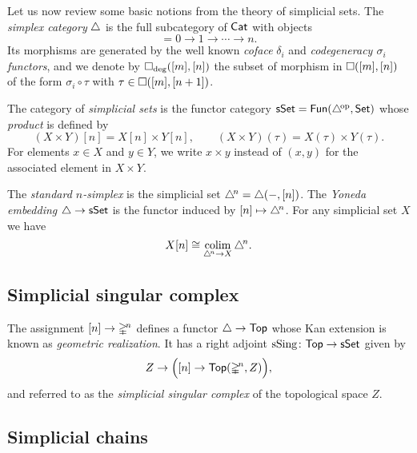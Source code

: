 Let us now review some basic notions from the theory of simplicial sets.
The \textit{simplex category} $\triangle$ is the full subcategory of $\mathsf{Cat}$ with objects
\begin{equation*}
[n] = 0 \to 1 \to \cdots \to n.
\end{equation*}
Its morphisms are generated by the well known \textit{coface} $\delta_i$ and \textit{codegeneracy $\sigma_i$ functors}, and we denote by $\square_{\deg}([m], [n])$ the subset of morphism in $\square([m], [n])$ of the form $\sigma_i \circ \tau$ with $\tau \in \square([m], [n+1])$.


The category of \textit{simplicial sets} is the functor category $\mathsf{sSet} = \mathsf{Fun}(\triangle^{\!\mathrm{op}}, \mathsf{Set})$ whose \textit{product} is defined by
\begin{equation*}
(X \times Y)[n] = X[n] \times Y[n], \qquad
(X \times Y)(\tau) = X(\tau) \times Y(\tau).
\end{equation*}
For elements $x \in X$ and $y \in Y$, we write $x \times y$ instead of $(x, y)$ for the associated element in $X \times Y$.

The \textit{standard $n$-simplex} is the simplicial set $\triangle^{\!n} = \triangle(-, [n])$.
The \textit{Yoneda embedding} $\triangle \to \mathsf{sSet}$ is the functor induced by $[n] \mapsto \triangle^{\!n}$.
For any simplicial set $X$ we have
\begin{equation*}
X[n] \cong \operatorname*{colim}_{\triangle^{\!n} \to X} \triangle^{\!n}.
\end{equation*}

\subsection{Simplicial singular complex}

The assignment $[n] \to \mathbb{\Delta}^{\!n}$ defines a functor $\triangle \to \mathsf{Top}$ whose Kan extension is known as \textit{geometric realization}.
It has a right adjoint $\operatorname{sSing} \colon \mathsf{Top} \to \mathsf{sSet}$ given by
\begin{equation*}
Z \to \Big([n] \to \mathsf{Top}(\mathbb{\Delta}^{\!n}, Z)\Big),
\end{equation*}
and referred to as the \textit{simplicial singular complex} of the topological space $Z$.

\subsection{Simplicial chains} \label{ss:simplicial chains}

